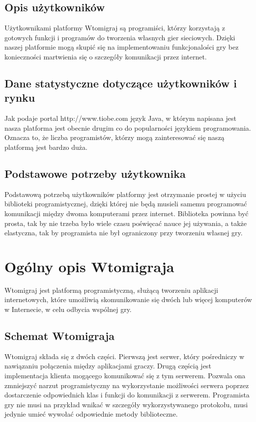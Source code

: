 \documentclass[a4paper, 12pt]{article}
\begin{document}
\subsection[Opis użytkowników]{Opis użytkowników}
Użytkownikami platformy Wtomigraj są programiści, którzy korzystają z gotowych funkcji i programów do tworzenia własnych gier sieciowych. Dzięki naszej platformie mogą skupić się na implementowaniu funkcjonalości gry bez konieczności martwienia się o szczegóły komunikacji przez internet. 

\subsection[Dane statystyczne dotyczące użytkowników i rynku]{Dane statystyczne dotyczące użytkowników i rynku}
Jak podaje portal http://www.tiobe.com język Java, w którym napisana jest nasza platforma jest obecnie drugim co do popularności językiem programowania. Oznacza to, że liczba programistów, którzy mogą zainteresować się naszą platformą jest bardzo duża.

\subsection[Podstawowe potrzeby użytkownika]{Podstawowe potrzeby użytkownika}
Podstawową potrzebą użytkowników platformy jest otrzymanie prostej w użyciu biblioteki programistycznej, dzięki której nie będą musieli samemu programować komunikacji między dwoma komputerami przez internet. Biblioteka powinna być prosta, tak by nie trzeba było wiele czasu poświęcać nauce jej używania, a także elastyczna, tak by programista nie był ograniczony przy tworzeniu własnej gry.

\section[Ogólny opis Wtomigraja]{Ogólny opis Wtomigraja}
Wtomigraj jest platformą programistyczną, służącą tworzeniu aplikacji internetowych, które umożliwią skomunikowanie się dwóch lub więcej komputerów w Internecie, w celu odbycia wspólnej gry.

\subsection[Schemat Wtomigraja]{Schemat Wtomigraja}
Wtomigraj składa się z dwóch części. Pierwszą jest serwer, który pośredniczy w nawiązaniu połączenia między aplikacjami graczy. Drugą częścią jest implementacja klienta mogącego komunikować się z tym serwerem. Pozwala ona zmniejszyć narzut programistyczny na wykorzystanie możliwości serwera poprzez dostarczenie odpowiednich klas i funkcji do komunikacji z serwerem. Programista gry nie musi na przykład wnikać w szczegóły wykorzystywanego protokołu, musi jedynie umieć wywołać odpowiednie metody biblioteczne. 
\end{document}
